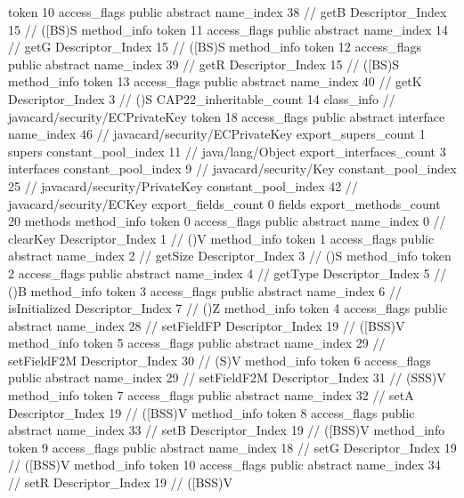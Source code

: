 {{{{{					token	10
					access_flags	public abstract
					name_index	38		// getB
					Descriptor_Index	15		// ([BS)S
				}
				method_info {
					token	11
					access_flags	public abstract
					name_index	14		// getG
					Descriptor_Index	15		// ([BS)S
				}
				method_info {
					token	12
					access_flags	public abstract
					name_index	39		// getR
					Descriptor_Index	15		// ([BS)S
				}
				method_info {
					token	13
					access_flags	public abstract
					name_index	40		// getK
					Descriptor_Index	3		// ()S
				}
			}
			CAP22_inheritable_count	14
		}
		class_info {		// javacard/security/ECPrivateKey
			token	18
			access_flags	public abstract interface
			name_index	46		// javacard/security/ECPrivateKey
			export_supers_count	1
			supers {
				constant_pool_index	11		// java/lang/Object
			}
			export_interfaces_count	3
			interfaces {
				constant_pool_index	9		// javacard/security/Key
				constant_pool_index	25		// javacard/security/PrivateKey
				constant_pool_index	42		// javacard/security/ECKey
			}
			export_fields_count	0
			fields {
			}
			export_methods_count	20
			methods {
				method_info {
					token	0
					access_flags	public abstract
					name_index	0		// clearKey
					Descriptor_Index	1		// ()V
				}
				method_info {
					token	1
					access_flags	public abstract
					name_index	2		// getSize
					Descriptor_Index	3		// ()S
				}
				method_info {
					token	2
					access_flags	public abstract
					name_index	4		// getType
					Descriptor_Index	5		// ()B
				}
				method_info {
					token	3
					access_flags	public abstract
					name_index	6		// isInitialized
					Descriptor_Index	7		// ()Z
				}
				method_info {
					token	4
					access_flags	public abstract
					name_index	28		// setFieldFP
					Descriptor_Index	19		// ([BSS)V
				}
				method_info {
					token	5
					access_flags	public abstract
					name_index	29		// setFieldF2M
					Descriptor_Index	30		// (S)V
				}
				method_info {
					token	6
					access_flags	public abstract
					name_index	29		// setFieldF2M
					Descriptor_Index	31		// (SSS)V
				}
				method_info {
					token	7
					access_flags	public abstract
					name_index	32		// setA
					Descriptor_Index	19		// ([BSS)V
				}
				method_info {
					token	8
					access_flags	public abstract
					name_index	33		// setB
					Descriptor_Index	19		// ([BSS)V
				}
				method_info {
					token	9
					access_flags	public abstract
					name_index	18		// setG
					Descriptor_Index	19		// ([BSS)V
				}
				method_info {
					token	10
					access_flags	public abstract
					name_index	34		// setR
					Descriptor_Index	19		// ([BSS)V
}}}}}
